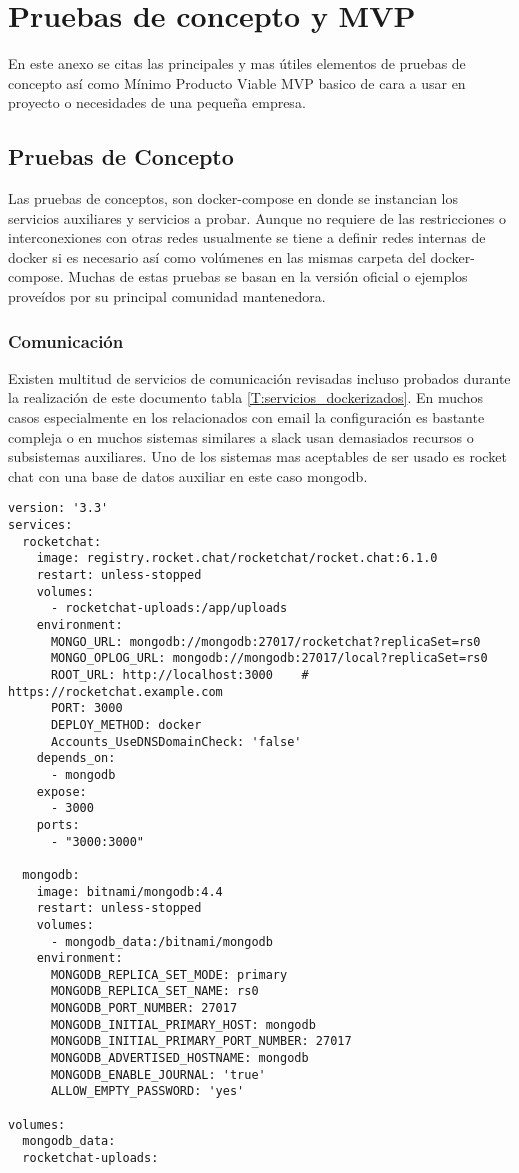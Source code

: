 \chapter{Pruebas de concepto y MVP}\label{S:anexo_E}

En este anexo se citas las principales y mas útiles elementos de pruebas de concepto así como Mínimo Producto Viable MVP basico de cara a usar en proyecto o necesidades de una pequeña empresa.

\section{Pruebas de Concepto}\label{S:pruebas_concepto}
Las pruebas de conceptos, son docker-compose en donde se instancian los servicios auxiliares y servicios a probar. Aunque no requiere de las restricciones o interconexiones con otras redes usualmente se tiene a definir redes internas de docker si es necesario así como volúmenes en las mismas carpeta del docker-compose. Muchas de estas pruebas se basan en la versión oficial o ejemplos proveídos por su principal comunidad mantenedora.

\subsection{Comunicación}
Existen multitud de servicios de comunicación revisadas incluso probados durante la realización de este documento tabla \ref{T:servicios_dockerizados}. En muchos casos especialmente en los relacionados con email la configuración es bastante compleja o en muchos sistemas similares a slack usan demasiados recursos o subsistemas auxiliares. Uno de los sistemas mas aceptables de ser usado es rocket chat\cite{c_rocket_chat} con una base de datos auxiliar en este caso mongodb.

\begin{lstlisting}[style=yaml, caption={docker-compose.yml Rocket Chat prueba de concepto.}, label={lst:rocket_chat} ]
version: '3.3'
services:  
  rocketchat:
    image: registry.rocket.chat/rocketchat/rocket.chat:6.1.0
    restart: unless-stopped
    volumes:
      - rocketchat-uploads:/app/uploads
    environment:
      MONGO_URL: mongodb://mongodb:27017/rocketchat?replicaSet=rs0
      MONGO_OPLOG_URL: mongodb://mongodb:27017/local?replicaSet=rs0
      ROOT_URL: http://localhost:3000    # https://rocketchat.example.com
      PORT: 3000
      DEPLOY_METHOD: docker
      Accounts_UseDNSDomainCheck: 'false'
    depends_on:
      - mongodb
    expose:
      - 3000
    ports:
      - "3000:3000"

  mongodb:
    image: bitnami/mongodb:4.4
    restart: unless-stopped
    volumes:
      - mongodb_data:/bitnami/mongodb
    environment:
      MONGODB_REPLICA_SET_MODE: primary
      MONGODB_REPLICA_SET_NAME: rs0
      MONGODB_PORT_NUMBER: 27017
      MONGODB_INITIAL_PRIMARY_HOST: mongodb
      MONGODB_INITIAL_PRIMARY_PORT_NUMBER: 27017
      MONGODB_ADVERTISED_HOSTNAME: mongodb
      MONGODB_ENABLE_JOURNAL: 'true'
      ALLOW_EMPTY_PASSWORD: 'yes'

volumes:
  mongodb_data:
  rocketchat-uploads:    

\end{lstlisting}

